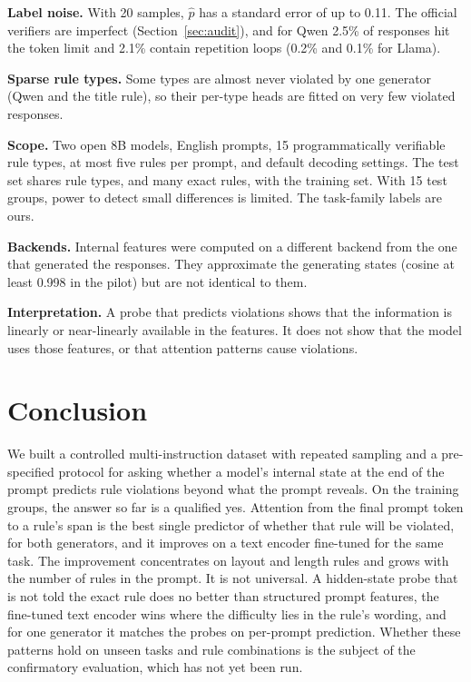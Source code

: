 \documentclass[10pt]{article}
\newcommand{\phat}{\hat{p}}
\begin{document}
\textbf{Label noise.} With 20 samples, $\phat$ has a standard error of up to 0.11. The official verifiers are imperfect
(Section~\ref{sec:audit}), and for Qwen 2.5\% of responses hit the token limit and 2.1\% contain repetition loops
(0.2\% and 0.1\% for Llama).

\textbf{Sparse rule types.} Some types are almost never violated by one generator (Qwen and the title rule), so their
per-type heads are fitted on very few violated responses.

\textbf{Scope.} Two open 8B models, English prompts, 15 programmatically verifiable rule types, at most five rules per
prompt, and default decoding settings. The test set shares rule types, and many exact rules, with the training set.
With 15 test groups, power to detect small differences is limited. The task-family labels are ours.

\textbf{Backends.} Internal features were computed on a different backend from the one that generated the responses.
They approximate the generating states (cosine at least 0.998 in the pilot) but are not identical to them.

\textbf{Interpretation.} A probe that predicts violations shows that the information is linearly or near-linearly
available in the features. It does not show that the model uses those features, or that attention patterns cause
violations.

\section{Conclusion}

We built a controlled multi-instruction dataset with repeated sampling and a pre-specified protocol for asking whether
a model's internal state at the end of the prompt predicts rule violations beyond what the prompt reveals. On the
training groups, the answer so far is a qualified yes. Attention from the final prompt token to a rule's span is the
best single predictor of whether that rule will be violated, for both generators, and it improves on a text encoder
fine-tuned for the same task. The improvement concentrates on layout and length rules and grows with the number of
rules in the prompt. It is not universal. A hidden-state probe that is not told the exact rule does no better than
structured prompt features, the fine-tuned text encoder wins where the difficulty lies in the rule's wording, and for
one generator it matches the probes on per-prompt prediction. Whether these patterns hold on unseen tasks and rule
combinations is the subject of the confirmatory evaluation, which has not yet been run.
\end{document}
